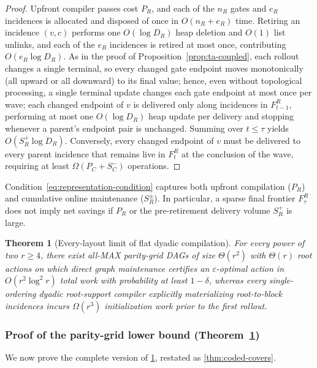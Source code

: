 \documentclass{article}
\theoremstyle{plain}
\newtheorem{theorem}{Theorem}[section]
\theoremstyle{definition}
\begin{document}
\begin{proof}
Upfront compiler passes cost $P_R$, and each of the $n_R$ gates and $e_R$ incidences is allocated and disposed of once in $O(n_R + e_R)$ time. Retiring an incidence $(v,c)$ performs one $O(\log D_R)$ heap deletion and $O(1)$ list unlinks, and each of the $e_R$ incidences is retired at most once, contributing $O(e_R \log D_R)$. As in the proof of Proposition~\ref{prop:ta-coupled}, each rollout changes a single terminal, so every changed gate endpoint moves monotonically (all upward or all downward) to its final value; hence, even without topological processing, a single terminal update changes each gate endpoint at most once per wave; each changed endpoint of $v$ is delivered only along incidences in $F_{t-1}^R$, performing at most one $O(\log D_R)$ heap update per delivery and stopping whenever a parent's endpoint pair is unchanged. Summing over $t \le \tau$ yields $O(S_R^+ \log D_R)$. Conversely, every changed endpoint of $v$ must be delivered to every parent incidence that remains live in $F_t^R$ at the conclusion of the wave, requiring at least $\Omega(P_C + S_C^-)$ operations.
\end{proof}

Condition~\eqref{eq:representation-condition} captures both upfront compilation ($P_R$) and cumulative online maintenance ($S_R^\pm$). In particular, a sparse final frontier $F_\tau^R$ does not imply net savings if $P_R$ or the pre-retirement delivery volume $S_R^+$ is large.

\begin{theorem}[Every-layout limit of flat dyadic compilation]
\label{thm:coded-main}\label{thm:every-layout-uct}
For every power of two $r\ge 4$, there exist all-MAX parity-grid DAGs of size $\Theta(r^2)$ with $\Theta(r)$ root actions on which direct graph maintenance certifies an $\varepsilon$-optimal action in $O(r^2\log^2 r)$ total work with probability at least $1-\delta$, whereas \emph{every} single-ordering dyadic root-support compiler explicitly materializing root-to-block incidences incurs $\Omega(r^3)$ initialization work prior to the first rollout.
\end{theorem}

\subsubsection{Proof of the parity-grid lower bound (Theorem~\ref{thm:coded-main})}

We now prove the complete version of \cref{thm:coded-main}, restated as \cref{thm:coded-covers}.
\end{document}
